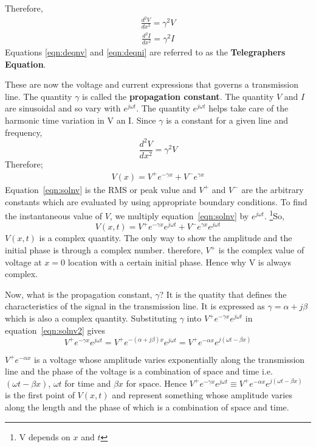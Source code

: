 Therefore, 
\begin{align}
\frac{d^{2}V}{dx^{2}} = \gamma^{2}V 
\label{eqn:deqnv}
\end{align}
\begin{align}
\frac{d^{2}I}{dx^{2}} = \gamma^{2}I 
\label{eqn:deqni}
\end{align}
Equations \ref{eqn:deqnv} and \ref{eqn:deqni} are referred to as the \textbf{Telegraphers Equation}.

These are now the voltage and current expressions that governs a transmission line. The quantity $ \gamma $ is called the \textbf{propagation constant}. The quantity $V$ and $I$ are sinusoidal and so vary with $e^{j\omega t}$. The quantity $ e ^{j\omega t} $ helps take care of the harmonic time variation in V an I. 
Since $ \gamma $ is a constant for a given line and frequency, 
\[ \frac{d^{2}V}{dx^{2}} = \gamma^{2}V\]
Therefore; 
\begin{align}
V(x) = V^{+} e ^{- \gamma x} + V^{-}e^{\gamma x}  
\label{eqn:solnv}
\end{align}
Equation~\eqref{eqn:solnv} is the RMS or peak value and $V^+$ and $V^-$ are the arbitrary constants which are evaluated by using appropriate boundary conditions. To find the instantaneous value of $V$, we multiply equation~\eqref{eqn:solnv} by $e^{j\omega t}$. \footnote{V depends on $x$ and $t$}So,
\begin{dmath}
V(x,t) = V^{+} e^{-\gamma x}e^{j\omega t} + V^{-} e^{\gamma x}e^{j\omega t}
\label{eqn:solnv2}
\end{dmath}
$V(x,t)$ is a complex quantity. The only way to show the amplitude and the initial phase is through a complex number. therefore, $ V^{+}$ is the complex value of voltage at $x=0$ location with a certain initial phase. Hence why V is always complex. 

Now, what is the propagation constant, $\gamma$? It is the quatity that defines the characteristics of the signal in the transmission line. It is expressed as $ \gamma = \alpha + j\beta $	 which is also a complex quantity. Substituting $\gamma$ into $V^{+}e^{- \gamma x}e^{j \omega t}$ in equation~\eqref{eqn:solnv2} gives
\begin{dmath}
V^{+}e^{- \gamma x}e^{j \omega t} = V^{+}e^{-( \alpha + j \beta )x}e^{j \omega t} = V^{+}e^{-\alpha x}e^{j(\omega t - \beta x)}
\end{dmath}

$ V^{+}e^{-\alpha x} $ is a voltage whose amplitude varies exponentially along the transmission line and the phase of the voltage is a combination of space and time i.e. $  (\omega t- \beta x) $, $ \omega t $ for time and $ \beta x  $ for space. Hence $ V^{+}e^{-\gamma x}e^{j\omega t} \equiv V^{+}e^{-\alpha x}e^{j( \omega t-\beta x)} $ is the first point of $V(x,t)$ and represent something whose amplitude varies along the length and the phase of which is a combination of space and time.

